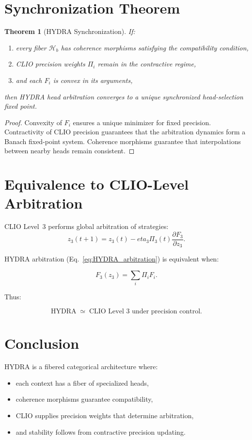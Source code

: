 \documentclass[12pt,oneside]{book}
\theoremstyle{plain}
\newtheorem{theorem}{Theorem}[chapter]
\theoremstyle{definition}
\def\eta{eta}%
\begin{document}
\section{Synchronization Theorem}

\begin{theorem}[HYDRA Synchronization]
If:

\begin{enumerate}
    \item every fiber $\mathcal{H}_b$ has coherence morphisms satisfying the compatibility condition,
    \item CLIO precision weights $\Pi_i$ remain in the contractive regime,
    \item and each $F_i$ is convex in its arguments,
\end{enumerate}

then HYDRA head arbitration converges to a unique synchronized head-selection
fixed point.
\end{theorem}

\begin{proof}
Convexity of $F_i$ ensures a unique minimizer for fixed precision.
Contractivity of CLIO precision guarantees that the arbitration dynamics form a
Banach fixed-point system.
Coherence morphisms guarantee that interpolations between nearby heads remain
consistent.
\end{proof}

\section{Equivalence to CLIO-Level Arbitration}

CLIO Level~3 performs global arbitration of strategies:
\[
z_3(t+1) = z_3(t) - \eta_3 \Pi_3(t) \frac{\partial F_3}{\partial z_3}.
\]

HYDRA arbitration (Eq.~\ref{eq:HYDRA_arbitration}) is equivalent when:

\[
F_3(z_3) = \sum_i \Pi_i F_i.
\]

Thus:

\[
\mathrm{HYDRA} \;\simeq\; \text{CLIO Level 3 under precision control}.
\]

\section{Conclusion}

HYDRA is a fibered categorical architecture where:

\begin{itemize}
    \item each context has a fiber of specialized heads,
    \item coherence morphisms guarantee compatibility,
    \item CLIO supplies precision weights that determine arbitration,
    \item and stability follows from contractive precision updating.
\end{itemize}
\end{document}
